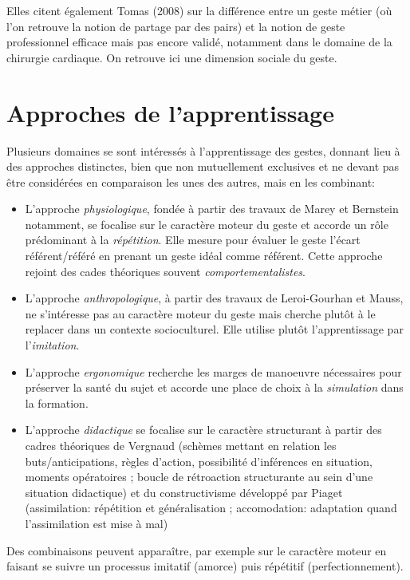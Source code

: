 \documentclass{article}
\begin{document}
Elles citent également Tomas (2008) sur la différence entre un geste métier 
(où l'on retrouve la notion de partage par des pairs) et la notion de 
geste professionnel efficace mais pas encore validé, notamment dans le 
domaine de la chirurgie cardiaque. On retrouve ici une dimension sociale 
du geste.


\section{Approches de l'apprentissage}

Plusieurs domaines se sont intéressés à l'apprentissage des gestes, 
donnant lieu à des approches distinctes, bien que non mutuellement 
exclusives et ne devant pas être considérées en comparaison les unes des 
autres, mais en les combinant:
\begin{itemize}
    \item L'approche \emph{physiologique}, fondée à partir des travaux de 
    Marey et Bernstein notamment, se focalise sur le caractère moteur du 
    geste et accorde un rôle prédominant à la \emph{répétition}. Elle 
    mesure pour évaluer le geste l'écart référent/référé en prenant un 
    geste idéal comme référent. Cette approche rejoint des cades théoriques 
    souvent \emph{comportementalistes}.
    \item L'approche \emph{anthropologique}, à partir des travaux de 
    Leroi-Gourhan et Mauss, ne s'intéresse pas au caractère moteur du geste 
    mais cherche plutôt à le replacer dans un contexte socioculturel. Elle 
    utilise plutôt l'apprentissage par l'\emph{imitation}.
    \item L'approche \emph{ergonomique} recherche les marges de manoeuvre 
    nécessaires pour préserver la santé du sujet et accorde une place de 
    choix à la \emph{simulation} dans la formation.
    \item L'approche \emph{didactique} se focalise sur le caractère 
    structurant à partir des cadres théoriques de Vergnaud (schèmes 
    mettant en relation les buts/anticipations, règles d'action, 
    possibilité d'inférences en situation, moments opératoires ; boucle 
    de rétroaction structurante au sein d'une situation didactique) et du 
    constructivisme développé par Piaget (assimilation: répétition et 
    généralisation ; accomodation: adaptation quand l'assimilation est 
    mise à mal)
\end{itemize}
Des combinaisons peuvent apparaître, par exemple sur le caractère moteur 
en faisant se suivre un processus imitatif (amorce) puis répétitif 
(perfectionnement).
\end{document}
